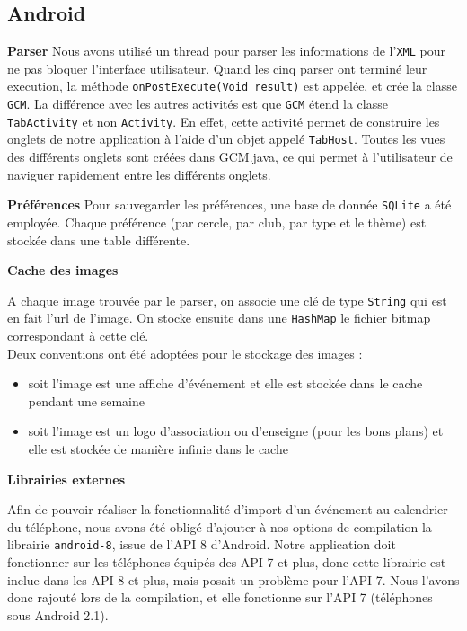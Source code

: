 \documentclass[a4paper, 11px]{article}
\begin{document}
\subsection{Android}
{\bf Parser}
Nous avons utilisé un thread pour parser les informations de l'\texttt{XML} pour ne pas bloquer l'interface utilisateur. Quand les cinq parser ont terminé leur execution, la méthode \texttt{onPostExecute(Void result)} est appelée, et crée la classe \texttt{GCM}. La différence avec les autres activités est que \texttt{GCM} étend la classe \texttt{TabActivity} et non \texttt{Activity}. En effet, cette activité permet de construire les onglets de notre application à l'aide d'un objet appelé \texttt{TabHost}. Toutes les vues des différents onglets sont créées dans GCM.java, ce qui permet à l'utilisateur de naviguer rapidement entre les différents onglets.


{\bf Préférences}
Pour sauvegarder les préférences, une base de donnée \texttt{SQLite} a été employée. Chaque préférence (par cercle, par club, par type et le thème) est stockée dans une table différente.
 
{\bf Cache des images}

A chaque image trouvée par le parser, on associe une clé de type \texttt{String} qui est en fait l'url de l'image. On stocke ensuite dans une \texttt{HashMap} le fichier bitmap correspondant à cette clé.\\
Deux conventions ont été adoptées pour le stockage des images :
\begin{itemize}
\item soit l'image est une affiche d'événement et elle est stockée dans le cache pendant une semaine
\item soit l'image est un logo d'association ou d'enseigne (pour les bons plans) et elle est stockée de manière infinie dans le cache\\
\end{itemize}

{\bf Librairies externes}

Afin de pouvoir réaliser la fonctionnalité d'import d'un événement au calendrier du téléphone, nous avons été obligé d'ajouter à nos options de compilation la librairie \texttt{android-8}, issue de l'API 8 d'Android. Notre application doit fonctionner sur les téléphones équipés des API 7 et plus, donc cette librairie est inclue dans les API 8 et plus, mais posait un problème pour l'API 7. Nous l'avons donc rajouté lors de la compilation, et elle fonctionne sur l'API 7 (téléphones sous Android 2.1).
\end{document}
